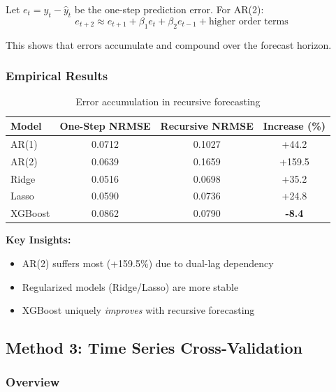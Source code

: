 \documentclass[12pt,a4paper]{article}
\begin{document}
Let $e_t = y_t - \hat{y}_t$ be the one-step prediction error. For AR(2):
\begin{equation}
e_{t+2} \approx e_{t+1} + \beta_1 e_t + \beta_2 e_{t-1} + \text{higher order terms}
\end{equation}

This shows that errors accumulate and compound over the forecast horizon.

\subsubsection{Empirical Results}

\begin{table}[H]
\centering
\begin{tabular}{lccc}
\toprule
\textbf{Model} & \textbf{One-Step NRMSE} & \textbf{Recursive NRMSE} & \textbf{Increase (\%)} \\
\midrule
AR(1)   & 0.0712 & 0.1027 & +44.2 \\
AR(2)   & 0.0639 & 0.1659 & +159.5 \\
Ridge   & 0.0516 & 0.0698 & +35.2 \\
Lasso   & 0.0590 & 0.0736 & +24.8 \\
XGBoost & 0.0862 & 0.0790 & \textbf{-8.4} \\
\bottomrule
\end{tabular}
\caption{Error accumulation in recursive forecasting}
\end{table}

\textbf{Key Insights:}
\begin{itemize}
    \item AR(2) suffers most (+159.5\%) due to dual-lag dependency
    \item Regularized models (Ridge/Lasso) are more stable
    \item XGBoost uniquely \textit{improves} with recursive forecasting
\end{itemize}

\subsection{Method 3: Time Series Cross-Validation}

\subsubsection{Overview}
\end{document}

